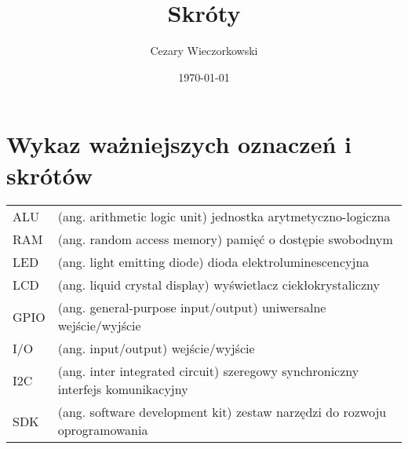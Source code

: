 \documentclass[./main.tex]{subfiles}
\author{Cezary Wieczorkowski}
\date{\today}
\title{Skróty}
\begin{document}
\section*{Wykaz ważniejszych oznaczeń i skrótów}

\begin{tabular}{l p{}}
ALU & (ang. arithmetic logic unit) jednostka arytmetyczno-logiczna\\[0pt]
RAM & (ang. random access memory) pamięć o dostępie swobodnym\\[0pt]
LED & (ang. light emitting diode) dioda elektroluminescencyjna\\[0pt]
LCD & (ang. liquid crystal display) wyświetlacz ciekłokrystaliczny\\[0pt]
GPIO & (ang. general-purpose input/output) uniwersalne wejście/wyjście\\[0pt]
I/O & (ang. input/output) wejście/wyjście\\[0pt]
I2C & (ang. inter integrated circuit) szeregowy synchroniczny interfejs komunikacyjny\\[0pt]
SDK & (ang. software development kit) zestaw narzędzi do rozwoju oprogramowania\\[0pt]
\end{tabular}
\end{document}
